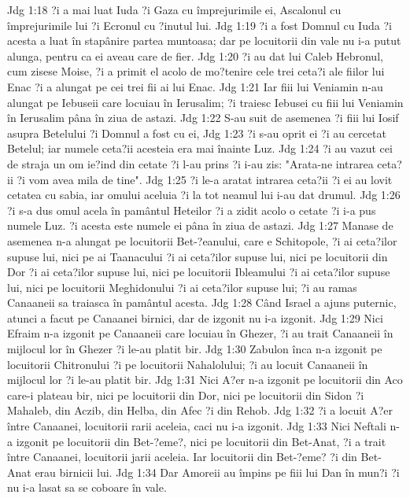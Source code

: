 Jdg 1:18  ?i a mai luat Iuda ?i Gaza cu împrejurimile ei, Ascalonul cu împrejurimile lui ?i Ecronul cu ?inutul lui.
Jdg 1:19  ?i a fost Domnul cu Iuda ?i acesta a luat în stapânire partea muntoasa; dar pe locuitorii din vale nu i-a putut alunga, pentru ca ei aveau care de fier.
Jdg 1:20  ?i au dat lui Caleb Hebronul, cum zisese Moise, ?i a primit el acolo de mo?tenire cele trei ceta?i ale fiilor lui Enac ?i a alungat pe cei trei fii ai lui Enac.
Jdg 1:21  Iar fiii lui Veniamin n-au alungat pe Iebuseii care locuiau în Ierusalim; ?i traiesc Iebusei cu fiii lui Veniamin în Ierusalim pâna în ziua de astazi.
Jdg 1:22  S-au suit de asemenea ?i fiii lui Iosif asupra Betelului ?i Domnul a fost cu ei,
Jdg 1:23  ?i s-au oprit ei ?i au cercetat Betelul; iar numele ceta?ii acesteia era mai înainte Luz.
Jdg 1:24  ?i au vazut cei de straja un om ie?ind din cetate ?i l-au prins ?i i-au zis: "Arata-ne intrarea ceta?ii ?i vom avea mila de tine".
Jdg 1:25  ?i le-a aratat intrarea ceta?ii ?i ei au lovit cetatea cu sabia, iar omului aceluia ?i la tot neamul lui i-au dat drumul.
Jdg 1:26  ?i s-a dus omul acela în pamântul Heteilor ?i a zidit acolo o cetate ?i i-a pus numele Luz. ?i acesta este numele ei pâna în ziua de astazi.
Jdg 1:27  Manase de asemenea n-a alungat pe locuitorii Bet-?eanului, care e Schitopole, ?i ai ceta?ilor supuse lui, nici pe ai Taanacului ?i ai ceta?ilor supuse lui, nici pe locuitorii din Dor ?i ai ceta?ilor supuse lui, nici pe locuitorii Ibleamului ?i ai ceta?ilor supuse lui, nici pe locuitorii Meghidonului ?i ai ceta?ilor supuse lui; ?i au ramas Canaaneii sa traiasca în pamântul acesta.
Jdg 1:28  Când Israel a ajuns puternic, atunci a facut pe Canaanei birnici, dar de izgonit nu i-a izgonit.
Jdg 1:29  Nici Efraim n-a izgonit pe Canaaneii care locuiau în Ghezer, ?i au trait Canaaneii în mijlocul lor în Ghezer ?i le-au platit bir.
Jdg 1:30  Zabulon înca n-a izgonit pe locuitorii Chitronului ?i pe locuitorii Nahalolului; ?i au locuit Canaaneii în mijlocul lor ?i le-au platit bir.
Jdg 1:31  Nici A?er n-a izgonit pe locuitorii din Aco care-i plateau bir, nici pe locuitorii din Dor, nici pe locuitorii din Sidon ?i Mahaleb, din Aczib, din Helba, din Afec ?i din Rehob.
Jdg 1:32  ?i a locuit A?er între Canaanei, locuitorii rarii aceleia, caci nu i-a izgonit.
Jdg 1:33  Nici Neftali n-a izgonit pe locuitorii din Bet-?eme?, nici pe locuitorii din Bet-Anat, ?i a trait între Canaanei, locuitorii jarii aceleia. Iar locuitorii din Bet-?eme? ?i din Bet-Anat erau birnicii lui.
Jdg 1:34  Dar Amoreii au împins pe fiii lui Dan în mun?i ?i nu i-a lasat sa se coboare în vale.
